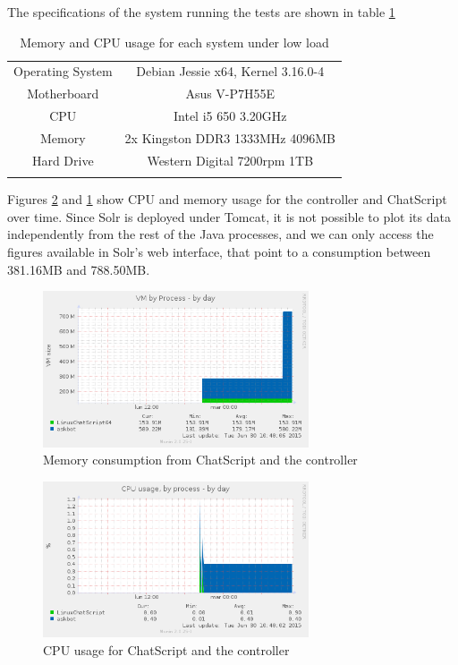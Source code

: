 The specifications of the system running the tests are shown in table \ref{tab:systeminfo}

\begin{table}
  \centering
  \begin{tabular*}{0.7\textwidth}{| c | c |}
    \hhline{|-|-|}
    Operating System & Debian Jessie x64, Kernel 3.16.0-4 \\ \hhline{|-|-|} 
    Motherboard & Asus V-P7H55E \\ \hhline{|-|-|} 
    CPU & Intel i5 650 3.20GHz  \\ \hhline{|-|-|} 
    Memory & 2x Kingston DDR3 1333MHz 4096MB  \\ \hhline{|-|-|} 
    Hard Drive & Western Digital 7200rpm 1TB \\ \hhline{|-|-|} 
    \end{tabular*}
  \caption{Memory and CPU usage for each system under low load}
  \label{tab:systeminfo}
\end{table}


Figures \ref{fig:cpuuse} and \ref{fig:memuse} show CPU and memory usage for the controller and ChatScript over time. Since Solr is deployed under Tomcat, it is not possible to plot its data independently from the rest of the Java processes, and we can only access the figures available in Solr's web interface, that point to a consumption between 381.16MB and 788.50MB.

\begin{figure}[!htbp]
    \centering
    \includegraphics[width=0.7\textwidth]{img/test/memory_by_process.png}
    \caption{Memory consumption from ChatScript and the controller}
    \label{fig:memuse}
\end{figure}

\begin{figure}[!htbp]
    \centering
    \includegraphics[width=0.7\textwidth]{img/test/cpu_usage.png}
    \caption{CPU usage for ChatScript and the controller}
    \label{fig:cpuuse}
\end{figure}

